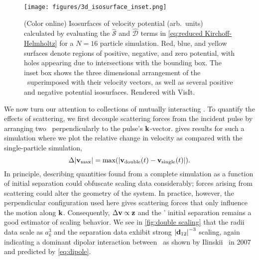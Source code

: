 \begin{figure}
  \centering
  \texttt{[image: figures/3d\_isosurface\_inset.png]}
  \caption{
    \label{fig:isosurface}(Color online) 
    Isosurfaces of velocity potential (arb.~units) calculated by evaluating the $\hat{\mathcal{S}}$ and $\hat{\mathcal{D}}$ terms in \cref{eq:reduced Kirchoff-Helmholtz} for a $N = 16$ particle simulation.
    Red, blue, and yellow surfaces denote regions of positive, negative, and zero potential, with holes appearing due to intersections with the bounding box.
    The inset box shows the three dimensional arrangement of the \bubbles\ superimposed with their velocity vectors, as well as several positive and negative potential isosurfaces.
    Rendered with VisIt\cite{VisIt}.
  }
\end{figure}
We now turn our attention to collections of mutually interacting \bubbles.
To quantify the effects of scattering, we first decouple scattering forces from the incident pulse by arranging two \bubbles\ perpendicularly to the pulse's $\vb{k}$-vector.
 gives results for such a simulation where we plot the relative change in velocity as compared with the single-particle simulation,
\begin{equation}
  \Delta \abs{\vb{v}_\text{max}} = \text{max}\qty(\abs{\vb{v}_\text{double}(t) - \vb{v}_\text{single}(t)}).
\end{equation}
In principle, describing quantities found from a complete simulation as a function of initial separation could obfuscate scaling data considerably; forces arising from scattering could alter the geometry of the system.
In practice, however, the perpendicular configuration used here gives scattering forces that only influence the motion along $\vb{k}$.
Consequently, $\Delta\vb{v} \propto \vb{z}$ and the \bubbles' initial separation remains a good estimator of scaling behavior. 
We see in \cref{fig:double scaling} that the radii data scale as $a_k^3$ and the
separation data exhibit strong $\abs{\vb{d}_{12}}^{-3}$ scaling, again
indicating a dominant dipolar interaction between \bubbles\ as shown by Ilinskii \etal\ in 2007~\cite{Ilinskii2007} and predicted by \cref{eq:dipole}.

